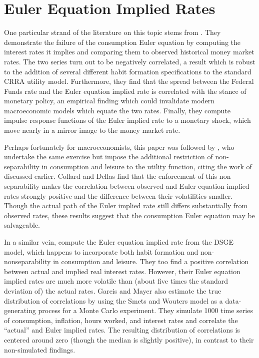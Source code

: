 \documentclass{hw}
\begin{document}
\section{Euler Equation Implied Rates}
One particular strand of the literature on this topic stems from \cite{canzoneri07}. They demonstrate the failure of the consumption Euler equation by computing the interest rates it implies and comparing them to observed historical money market rates. The two series turn out to be negatively correlated, a result which is robust to the addition of several different habit formation specifications to the standard CRRA utility model. Furthermore, they find that the spread between the Federal Funds rate and the Euler equation implied rate is correlated with the stance of monetary policy, an empirical finding which could invalidate modern macroeconomic models which equate the two rates. Finally, they compute impulse response functions of the Euler implied rate to a monetary shock, which move nearly in a mirror image to the money market rate.

Perhaps fortunately for macroeconomists, this paper was followed by \cite{collard11}, who undertake the same exercise but impose the additional restriction of non-separability in consumption and leisure to the utility function, citing the work of \cite{basu02} discussed earlier. Collard and Dellas find that the enforcement of this non-separability makes the correlation between observed and Euler equation implied rates strongly positive and the difference between their volatilities smaller. Though the actual path of the Euler implied rate still differs substantially from observed rates, these results suggest that the consumption Euler equation may be salvageable.

In a similar vein, \cite{gareis13} compute the Euler equation implied rate from the \cite{smets07} DSGE model, which happens to incorporate both habit formation and non-nonseparability in consumption and leisure. They too find a positive correlation between actual and implied real interest rates. However, their Euler equation implied rates are much more volatile than (about five times the standard deviation of) the actual rates. Gareis and Mayer also estimate the true distribution of correlations by using the Smets and Wouters model as a data-generating process for a Monte Carlo experiment. They simulate 1000 time series of consumption, inflation, hours worked, and interest rates and correlate the ``actual'' and Euler implied rates. The resulting distribution of correlations is centered around zero (though the median is slightly positive), in contrast to their non-simulated findings.
\end{document}
